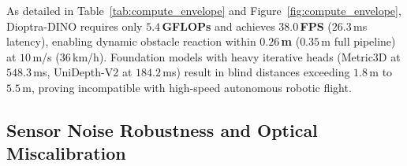\begin{table}[h]
\centering
\caption{\textbf{Edge Robotics Hardware Profiling and Autonomous UAV Reaction Distance}. Benchmarked on Apple Silicon M3 GPU (FP32). Parameters (M), native input resolution, latency (mean ms), throughput (FPS), GFLOPs, and dynamic blind reaction distance at $10$\,m/s ($36$\,km/h) agile flight speed.}
\label{tab:compute_envelope}
\vspace{0.2em}
\end{table}

As detailed in Table~\ref{tab:compute_envelope} and Figure~\ref{fig:compute_envelope}, Dioptra-DINO requires only \textbf{$5.4$\,GFLOPs} and achieves \textbf{$38.0$\,FPS} ($26.3$\,ms latency), enabling dynamic obstacle reaction within \textbf{$0.26$\,m} ($0.35$\,m full pipeline) at $10$\,m/s ($36$\,km/h). Foundation models with heavy iterative heads (Metric3D at $548.3$\,ms, UniDepth-V2 at $184.2$\,ms) result in blind distances exceeding $1.8$\,m to $5.5$\,m, proving incompatible with high-speed autonomous robotic flight.

\subsection{Sensor Noise Robustness and Optical Miscalibration}
\label{sec:sensor_noise_robustness}

